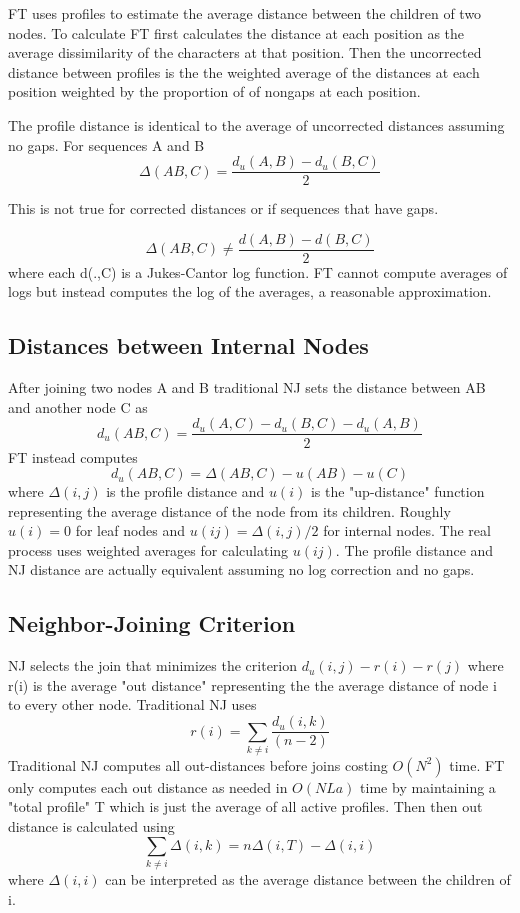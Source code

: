 \documentclass[a4paper]{article}
\begin{document}
FT uses profiles to estimate the average distance between the children of two nodes. To calculate FT first calculates the distance at each position as the average dissimilarity of the characters at that position. Then the uncorrected distance between profiles is the the weighted average of the distances at each position weighted by the proportion of of nongaps at each position.

The profile distance is identical to the average of uncorrected distances assuming no gaps. For sequences A and B 
\[\Delta(AB,C) = \frac{d_u(A,B) - d_u(B,C)}{2}\]

This is not true for corrected distances or if sequences 
that have gaps. 

\[\Delta(AB,C) \neq \frac{d(A,B) - d(B,C)}{2} \]
where each  d(.,C) is a Jukes-Cantor log function. FT cannot compute averages of logs but instead computes the log of the averages, a reasonable approximation. 

\subsection{Distances between Internal Nodes}

After joining two nodes A and B traditional NJ sets the distance between AB and another node C as 
\[d_u(AB,C) = \frac{d_u(A,C) - d_u(B,C) - d_u(A,B)}{2}\]
FT instead computes 
\[d_u(AB,C) = \Delta(AB,C) - u(AB) - u(C)\]
where \(\Delta(i,j)\) is the profile distance and \(u(i)\) is the "up-distance" function representing the average distance of the node from its children. Roughly \(u(i) = 0 \) for leaf nodes and \(u(ij) = \Delta(i,j)/2\) for internal nodes. The real process uses weighted averages for calculating \(u(ij)\). 
The profile distance and NJ distance are actually equivalent assuming no log correction and no gaps. 

\subsection{Neighbor-Joining Criterion} 

NJ selects the join that minimizes the criterion \(d_u(i,j) - r(i) - r(j) \) where r(i) is the average "out distance" representing the the average distance of node i to every other node. Traditional NJ uses 
\[r(i) = \sum_{k \neq i} \frac{d_u(i,k)}{(n-2)}\]
Traditional NJ computes all out-distances before joins costing $O(N^2)$ time. FT only computes each out distance as needed in $O(NLa)$ time by maintaining a "total profile" T which is just the average of all active profiles. Then then out distance is calculated using  
\[\sum_{k \neq i}\Delta(i,k) = n\Delta(i,T) - \Delta(i,i)\] 
where $\Delta(i,i)$ can be interpreted as the average distance between the children of i. 
\end{document}
